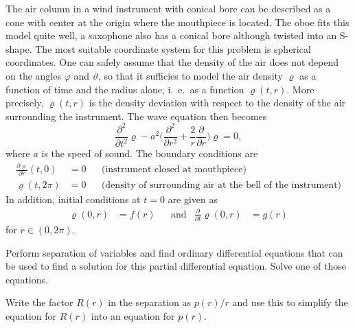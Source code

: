 The air column in a wind instrument with conical bore can be described
as a cone with center at the origin where the mouthpiece is located.
The oboe fits this model quite well, a saxophone also has a conical bore
although twisted into an S-shape.
The most suitable coordinate system for this problem is spherical coordinates.
One can safely assume that the density of the air does not depend on the angles
$\varphi$ and $\vartheta$, so that it sufficies to model the air
density $\varrho$ as a function of time and the radius alone, i.~e.~as
a function $\varrho(t,r)$.
More precisely, $\varrho(t,r)$ is the density deviation with respect 
to the density of the air surrounding the instrument.
The wave equation then becomes
\begin{equation}
\frac{\partial^2}{\partial t^2}\varrho
-
a^2\biggl(
\frac{\partial^2}{\partial r^2}
+\frac2r\frac{\partial}{\partial r}
\biggr)\varrho
=
0,
\label{40000020:equation}
\end{equation}
where $a$ is the speed of sound.
The boundary conditions are 
\begin{align*}
\frac{\partial\varrho}{\partial r}(t,0)&=0&&\text{(instrument closed at mouthpiece)}
\\
\varrho(t,2\pi)&=0&&\text{(density of surrounding air at the bell of the instrument)}
\end{align*}
In addition, initial conditions at $t=0$ are given as
\[
\begin{aligned}
\varrho(0,r) &= f(r)
&
&\text{and}&
\frac{\partial}{\partial t} \varrho(0,r) &= g(r)
\end{aligned}
\]
for $r\in(0,2\pi)$.

\begin{teilaufgaben}
\item
Perform separation of variables and find ordinary differential equations
that can be used to find a solution for this partial differential equation.
Solve one of those equations.
\item
Write the factor $R(r)$ in the separation as $p(r)/r$ and use this
to simplify the equation for $R(r)$ into an equation for $p(r)$.
\end{teilaufgaben}

